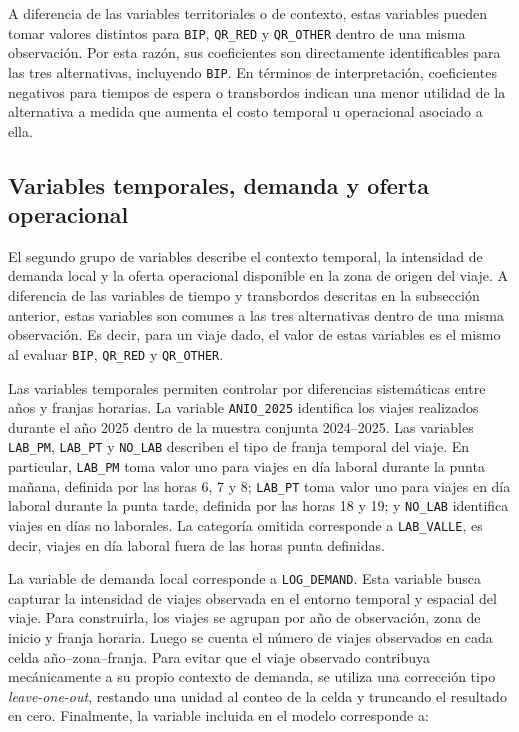 A diferencia de las variables territoriales o de contexto, estas variables pueden tomar valores distintos para \texttt{BIP}, \texttt{QR\_RED} y \texttt{QR\_OTHER} dentro de una misma observación. Por esta razón, sus coeficientes son directamente identificables para las tres alternativas, incluyendo \texttt{BIP}. En términos de interpretación, coeficientes negativos para tiempos de espera o transbordos indican una menor utilidad de la alternativa a medida que aumenta el costo temporal u operacional asociado a ella.

\subsection{Variables temporales, demanda y oferta operacional}

El segundo grupo de variables describe el contexto temporal, la intensidad de demanda local y la oferta operacional disponible en la zona de origen del viaje. A diferencia de las variables de tiempo y transbordos descritas en la subsección anterior, estas variables son comunes a las tres alternativas dentro de una misma observación. Es decir, para un viaje dado, el valor de estas variables es el mismo al evaluar \texttt{BIP}, \texttt{QR\_RED} y \texttt{QR\_OTHER}.

Las variables temporales permiten controlar por diferencias sistemáticas entre años y franjas horarias. La variable \texttt{ANIO\_2025} identifica los viajes realizados durante el año 2025 dentro de la muestra conjunta 2024--2025. Las variables \texttt{LAB\_PM}, \texttt{LAB\_PT} y \texttt{NO\_LAB} describen el tipo de franja temporal del viaje. En particular, \texttt{LAB\_PM} toma valor uno para viajes en día laboral durante la punta mañana, definida por las horas 6, 7 y 8; \texttt{LAB\_PT} toma valor uno para viajes en día laboral durante la punta tarde, definida por las horas 18 y 19; y \texttt{NO\_LAB} identifica viajes en días no laborales. La categoría omitida corresponde a \texttt{LAB\_VALLE}, es decir, viajes en día laboral fuera de las horas punta definidas.

La variable de demanda local corresponde a \texttt{LOG\_DEMAND}. Esta variable busca capturar la intensidad de viajes observada en el entorno temporal y espacial del viaje. Para construirla, los viajes se agrupan por año de observación, zona de inicio y franja horaria. Luego se cuenta el número de viajes observados en cada celda año--zona--franja. Para evitar que el viaje observado contribuya mecánicamente a su propio contexto de demanda, se utiliza una corrección tipo \textit{leave-one-out}, restando una unidad al conteo de la celda y truncando el resultado en cero. Finalmente, la variable incluida en el modelo corresponde a:

